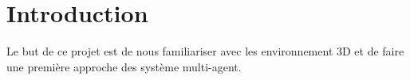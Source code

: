 \chapter{Introduction}
\thispagestyle{fancy}
Le but de ce projet est de nous familiariser avec les environnement 3D et de faire une première approche des système multi-agent.

 

